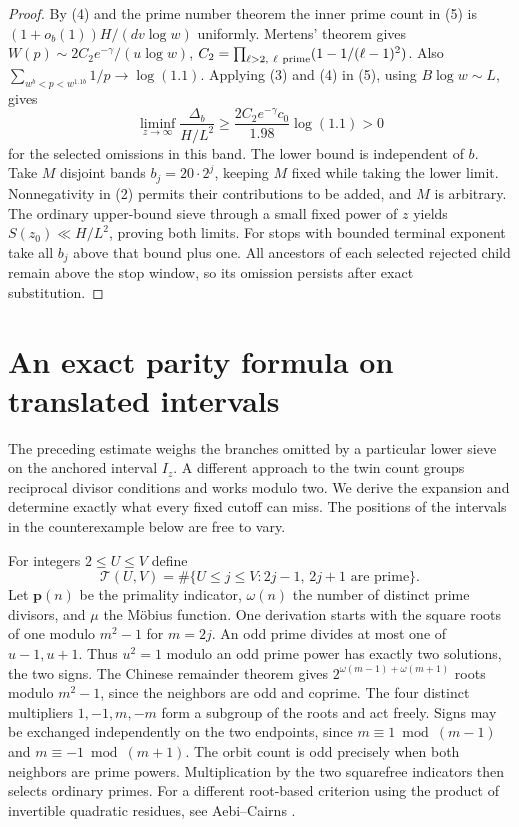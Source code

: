 \documentclass[11pt]{article}
\begin{document}
\begin{proof}
By (4) and the prime number theorem the inner prime count in (5) is $(1+o_b(1))H/(dv\log w)$ uniformly. Mertens' theorem gives $W(p)\sim2C_2e^{-\gamma}/(u\log w)$, $C_2=\prod_{\ell>2,\ \ell\ {\rm prime}}(1-1/(\ell-1)^2)$. Also $\sum_{w^b<p<w^{1.1b}}1/p\to\log(1.1)$. Applying (3) and (4) in (5), using $B\log w\sim L$, gives
\[
 \liminf_{z\to\infty}\frac{\Delta_b}{H/L^2}
 \ge \frac{2C_2e^{-\gamma} c_0}{1.98}\log(1.1)>0
\]
for the selected omissions in this band. The lower bound is independent of $b$. Take $M$ disjoint bands $b_j=20\cdot2^j$, keeping $M$ fixed while taking the lower limit. Nonnegativity in (2) permits their contributions to be added, and $M$ is arbitrary. The ordinary upper-bound sieve through a small fixed power of $z$ yields $S(z_0)\ll H/L^2$, proving both limits. For stops with bounded terminal exponent take all $b_j$ above that bound plus one. All ancestors of each selected rejected child remain above the stop window, so its omission persists after exact substitution.
\end{proof}

\setcounter{equation}{6}
\section{An exact parity formula on translated intervals}
The preceding estimate weighs the branches omitted by a particular
lower sieve on the anchored interval $I_z$. A different approach to
the twin count groups reciprocal divisor conditions and works modulo
two. We derive the expansion and determine exactly what every fixed
cutoff can miss. The positions of the intervals in the counterexample
below are free to vary.

For integers $2\le U\le V$ define
\[
 \mathcal T(U,V)=\#\{U\le j\le V:2j-1,\,2j+1\text{ are prime}\}.
\]
Let $\mathbf p(n)$ be the primality indicator, $\omega(n)$ the number of
distinct prime divisors, and $\mu$ the M\"obius function. One derivation
starts with the square roots of one modulo $m^2-1$ for $m=2j$.
An odd prime divides at most one of $u-1,u+1$. Thus $u^2=1$
modulo an odd prime power has exactly two solutions, the two signs.
The Chinese remainder theorem gives $2^{\omega(m-1)+\omega(m+1)}$
roots modulo $m^2-1$, since the neighbors are odd and coprime.
The four distinct multipliers $1,-1,m,-m$ form a subgroup of the
roots and act freely. Signs may be exchanged independently on the two
endpoints, since $m\equiv1\bmod(m-1)$ and $m\equiv-1\bmod(m+1)$.
The orbit count is odd precisely when both neighbors are prime powers.
Multiplication by the two squarefree indicators then selects ordinary
primes. For a different root-based criterion using the product of
invertible quadratic residues, see Aebi--Cairns \cite[Theorem 2]{AC}.
\end{document}
